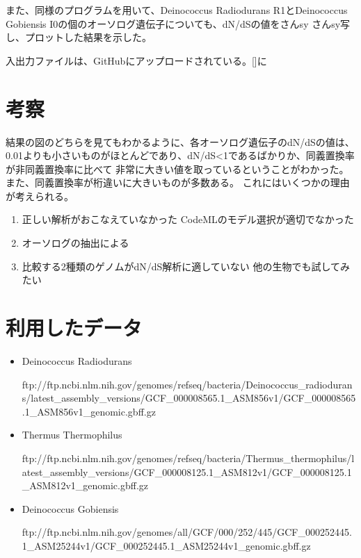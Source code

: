 \documentclass[a4j,12pt]{jreport}
\begin{document}
\begin{figure}[H]
\begin{center}
\begin{tabular}{cc}
      \end{tabular}
    \end{center}
  \end{figure}

また、同様のプログラムを用いて、Deinococcus Radiodurans R1とDeinococcus Gobiensis I0の個のオーソログ遺伝子についても、dN/dSの値をさんsy
さんsy写し、プロットした結果を示した。

入出力ファイルは、GitHubにアップロードされている。[]に



\section{考察}
結果の図のどちらを見てもわかるように、各オーソログ遺伝子のdN/dSの値は、0.01よりも小さいものがほとんどであり、dN/dS<1であるばかりか、同義置換率が非同義置換率に比べて
非常に大きい値を取っているということがわかった。
また、同義置換率が桁違いに大きいものが多数ある。
これにはいくつかの理由が考えられる。
\begin{enumerate}
  \item 正しい解析がおこなえていなかった
  CodeMLのモデル選択が適切でなかった
  \item オーソログの抽出による
  \item 比較する2種類のゲノムがdN/dS解析に適していない
  他の生物でも試してみたい
\end{enumerate}



\section{利用したデータ}
    \begin{itemize}     
        \item Deinococcus Radiodurans
        
        ftp://ftp.ncbi.nlm.nih.gov/genomes/refseq/bacteria/Deinococcus_radiodurans/latest_assembly_versions/GCF_000008565.1_ASM856v1/GCF_000008565.1_ASM856v1_genomic.gbff.gz
        \item Thermus Thermophilus
        
        ftp://ftp.ncbi.nlm.nih.gov/genomes/refseq/bacteria/Thermus_thermophilus/latest_assembly_versions/GCF_000008125.1_ASM812v1/GCF_000008125.1_ASM812v1_genomic.gbff.gz

        \item Deinococcus Gobiensis
        
        ftp://ftp.ncbi.nlm.nih.gov/genomes/all/GCF/000/252/445/GCF_000252445.1_ASM25244v1/GCF_000252445.1_ASM25244v1_genomic.gbff.gz

    \end{itemize}
\end{document}
